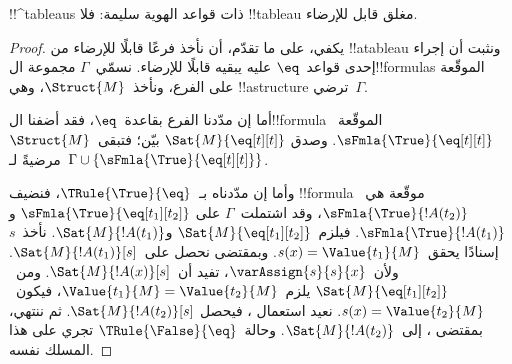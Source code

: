 \documentclass[../../../include/open-logic-section]{subfiles}
\begin{document}


\begin{prop}
!!^{tableau}s ذات قواعد الهوية سليمة: فلا !!{tableau} مغلق قابل للإرضاء.
\end{prop}

\begin{proof}
يكفي، على ما تقدّم، أن نأخذ فرعًا قابلًا للإرضاء من !!a{tableau}
ونثبت أن إجراء إحدى قواعد~$\eq$ عليه يبقيه قابلًا للإرضاء.
نسمّي~$\Gamma$ مجموعة ال!!{formula}s الموقّعة على الفرع،
ونأخذ~$\Struct{M}$، وهي !!a{structure} ترضي~$\Gamma$.

أما إن مدّدنا الفرع بقاعدة~$\eq$، فقد أضفنا ال!!{formula}
الموقّعة~$\sFmla{\True}{\eq[t][t]}$. وصدق
$\Sat{M}{\eq[t][t]}$ بيّن؛ فتبقى~$\Struct{M}$ مرضيةً
لـ~$\Gamma \cup
\{\sFmla{\True}{\eq[t][t]}\}$.

وأما إن مدّدناه بـ~$\TRule{\True}{\eq}$، فنضيف !!{formula}
موقّعة هي~$\sFmla{\True}{!A(t_2)}$، وقد اشتملت~$\Gamma$ على
$\sFmla{\True}{\eq[t_1][t_2]}$ و$\sFmla{\True}{!A(t_1)}$.
فيلزم~$\Sat{M}{\eq[t_1][t_2]}$ و$\Sat{M}{!A(t_1)}$.
نأخذ~$s$ إسنادًا يحقق~$s(x) = \Value{t_1}{M}$.
وبمقتضى 
نحصل على~$\Sat{M}{!A(t_1)}[s]$. ولأن~$\varAssign{s}{s}{x}$،
تفيد  أن~$\Sat{M}{!A(x)}[s]$.
ومن~$\Sat{M}{\eq[t_1][t_2]}$ يلزم~$\Value{t_1}{M} = \Value{t_2}{M}$،
فيكون~$s(x) = \Value{t_2}{M}$. نعيد استعمال
، فيحصل
$\Sat{M}{!A(t_2)}[s]$. ثم ننتهي، بمقتضى
، إلى~$\Sat{M}{!A(t_2)}$.
وحالة~$\TRule{\False}{\eq}$ تجري على هذا المسلك نفسه.
\end{proof}
\end{document}
